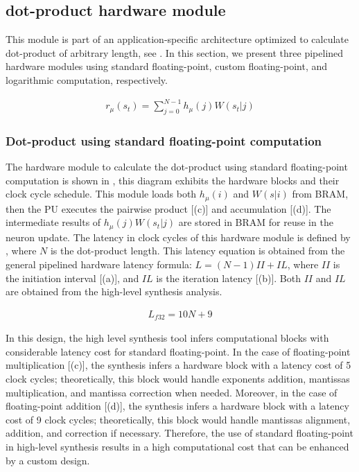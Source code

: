 \subsection{dot-product hardware module}
This module is part of an application-specific architecture optimized to calculate dot-product of arbitrary length, see . In this section, we present three pipelined hardware modules using standard floating-point, custom floating-point, and logarithmic computation, respectively.

\begin{eqnarray} \label{eq:dot_product}
r_{\mu}\left(s_t\right)=\sum_{j=0}^{N-1}h_{\mu}(j)W(s_t|j)
\end{eqnarray}



\subsubsection{Dot-product using standard floating-point computation}
 The hardware module to calculate the dot-product using standard floating-point computation is shown in , this diagram exhibits the hardware blocks and their clock cycle schedule. This module loads both $h_\mu(i)$ and $W(s|i)$ from BRAM, then the PU executes the pairwise product [(c)] and accumulation [(d)]. The intermediate results of $h_\mu(j) W(s_t|j)$ are stored in BRAM for reuse in the neuron update. The latency in clock cycles of this hardware module is defined by , where $N$ is the dot-product length. This latency equation is obtained from the general pipelined hardware latency formula: $L=\left(N-1\right)II+IL$, where $II$ is the initiation interval [(a)], and $IL$ is the iteration latency [(b)]. Both $II$ and $IL$ are obtained from the high-level synthesis analysis.
 
 \begin{eqnarray} \label{eq:dot_standard_float_latency}
 L_{f32}=10N+9
 \end{eqnarray}
 
In this design, the high level synthesis tool infers computational blocks with considerable latency cost for standard floating-point. In the case of floating-point multiplication [(c)], the synthesis infers a hardware block with a latency cost of 5 clock cycles; theoretically, this block would handle exponents addition, mantissas multiplication, and mantissa correction when needed. Moreover, in the case of floating-point addition [(d)], the synthesis infers a hardware block with a latency cost of 9 clock cycles; theoretically, this block would handle mantissas alignment, addition, and correction if necessary. Therefore, the use of standard floating-point in high-level synthesis results in a high computational cost that can be enhanced by a custom design.



